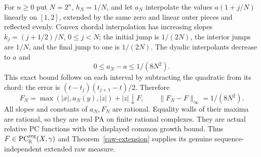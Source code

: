 \documentclass[11pt]{article}
\newcommand{\R}{\mathbb R}
\newcommand{\PC}{\operatorname{PC}}
\begin{document}
For $n\geq0$ put $N=2^n$, $h_N=1/N$, and let $a_N$ interpolate the
values $a(1+j/N)$ linearly on $[1,2]$, extended by the same zero and
linear outer pieces and reflected evenly. Convex chordal interpolation
has increasing slopes
$k_j=(j+1/2)/N$, $0\leq j<N$; the initial jump is $1/(2N)$,
the interior jumps are $1/N$, and the final jump to one is $1/(2N)$.
The dyadic interpolants decrease to $a$ and
\[
 0\leq a_N-a\leq1/(8N^2).
\]
This exact bound follows on each interval by subtracting the quadratic
from its chord: the error is $(t-t_j)(t_{j+1}-t)/2$.
Therefore
\[
 F_N=\max(|x|,a_N(y),|z|)+|z|\downarrow F,\qquad
 \|F_N-F\|_\infty=1/(8N^2).
\]
All slopes and constants of $a_N,F_N$ are rational. Equality walls of
their maxima are rational, so they are real PA on finite rational
complexes. They are actual relative PC functions with the displayed
common growth bound. Thus $F\in\PC^{\rm reg}_{\R}(X,\gamma)$ and
Theorem~\ref{raw-extension} supplies its genuine sequence-independent
extended raw measure.
\end{document}
